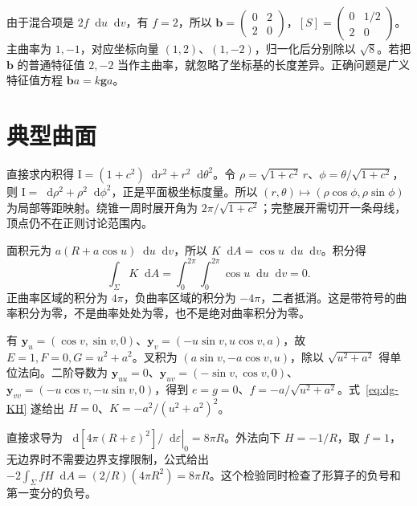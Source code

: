 \documentclass[UTF8,12pt,a4paper,fontset=fandol]{ctexbook}
\newcommand{\dd}{\mathop{}\!\mathrm d}
\begin{document}
\begin{solve}
由于混合项是 $2f\dd u\dd v$，有 $f=2$，所以 $\mathbf b=\begin{pmatrix}0&2\\2&0\end{pmatrix}$，$[S]=\begin{pmatrix}0&1/2\\2&0\end{pmatrix}$。主曲率为 $1,-1$，对应坐标向量 $(1,2)$、$(1,-2)$，归一化后分别除以 $\sqrt8$。若把 $\mathbf b$ 的普通特征值 $2,-2$ 当作主曲率，就忽略了坐标基的长度差异。正确问题是广义特征值方程 $\mathbf b a=k\mathbf g a$。
\end{solve}

\section{典型曲面}
\begin{solve}
直接求内积得 $\mathrm I=(1+c^2)\dd r^2+r^2\dd\theta^2$。令 $\rho=\sqrt{1+c^2}\,r$、$\phi=\theta/\sqrt{1+c^2}$，则 $\mathrm I=\dd\rho^2+\rho^2\dd\phi^2$，正是平面极坐标度量。所以 $(r,\theta)\mapsto(\rho\cos\phi,\rho\sin\phi)$ 为局部等距映射。绕锥一周时展开角为 $2\pi/\sqrt{1+c^2}$；完整展开需切开一条母线，顶点仍不在正则讨论范围内。
\end{solve}

\begin{solve}
面积元为 $a(R+a\cos u)\dd u\dd v$，所以 $K\dd A=\cos u\dd u\dd v$。积分得
\[
 \int_\Sigma K\dd A=\int_0^{2\pi}\int_0^{2\pi}\cos u\dd u\dd v=0.
\]
正曲率区域的积分为 $4\pi$，负曲率区域的积分为 $-4\pi$，二者抵消。这是带符号的曲率积分为零，不是曲率处处为零，也不是绝对曲率积分为零。
\end{solve}

\begin{solve}
有 $\mathbf y_u=(\cos v,\sin v,0)$、$\mathbf y_v=(-u\sin v,u\cos v,a)$，故 $E=1,F=0,G=u^2+a^2$。叉积为 $(a\sin v,-a\cos v,u)$，除以 $\sqrt{u^2+a^2}$ 得单位法向。二阶导数为 $\mathbf y_{uu}=0$、$\mathbf y_{uv}=(-\sin v,\cos v,0)$、$\mathbf y_{vv}=(-u\cos v,-u\sin v,0)$，得到 $e=g=0$、$f=-a/\sqrt{u^2+a^2}$。式~\eqref{eq:dg-KH} 遂给出 $H=0$、$K=-a^2/(u^2+a^2)^2$。
\end{solve}

\begin{solve}
直接求导为 $\left.\dd[4\pi(R+\varepsilon)^2]/\dd\varepsilon\right|_0=8\pi R$。外法向下 $H=-1/R$，取 $f=1$，无边界时不需要边界支撑限制，公式给出 $-2\int_\Sigma fH\dd A=(2/R)(4\pi R^2)=8\pi R$。这个检验同时检查了形算子的负号和第一变分的负号。
\end{solve}
\end{document}
